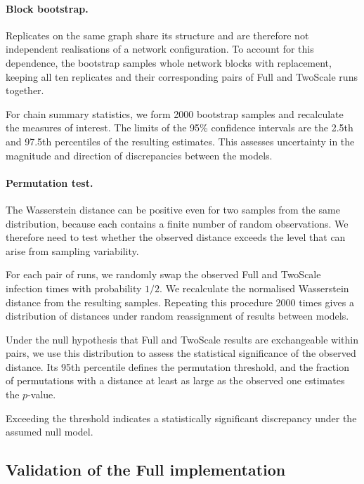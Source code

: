 \documentclass{ieeeaccess}
\newcommand{\Full}{\textup{Full}}
\newcommand{\TS}{\textup{TwoScale}}
\begin{document}
\paragraph{Block bootstrap.}
Replicates on the same graph share its structure and are therefore not independent realisations of a network configuration. To account for this dependence, the bootstrap samples whole network blocks with replacement, keeping all ten replicates and their corresponding pairs of \Full{} and \TS{} runs together.

For chain summary statistics, we form 2000 bootstrap samples and recalculate the measures of interest. The limits of the 95\% confidence intervals are the 2.5th and 97.5th percentiles of the resulting estimates. This assesses uncertainty in the magnitude and direction of discrepancies between the models.

\paragraph{Permutation test.}
The Wasserstein distance can be positive even for two samples from the same distribution, because each contains a finite number of random observations. We therefore need to test whether the observed distance exceeds the level that can arise from sampling variability.

For each pair of runs, we randomly swap the observed \Full{} and \TS{} infection times with probability $1/2$. We recalculate the normalised Wasserstein distance from the resulting samples. Repeating this procedure 2000 times gives a distribution of distances under random reassignment of results between models.

Under the null hypothesis that \Full{} and \TS{} results are exchangeable within pairs, we use this distribution to assess the statistical significance of the observed distance. Its 95th percentile defines the permutation threshold, and the fraction of permutations with a distance at least as large as the observed one estimates the $p$-value.

Exceeding the threshold indicates a statistically significant discrepancy under the assumed null model.

\subsection{Validation of the Full implementation}
\end{document}
